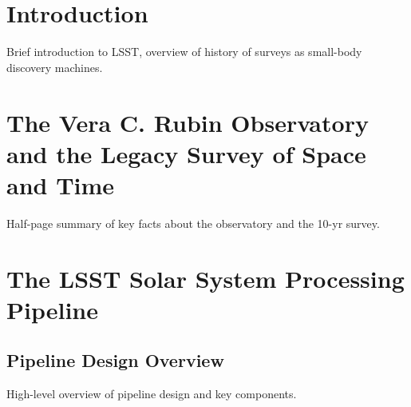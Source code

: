 \section{Introduction}

Brief introduction to LSST, overview of history of surveys as small-body
discovery machines.



\section{The Vera C. Rubin Observatory and the Legacy Survey of Space and Time}

Half-page summary of key facts about the observatory and the 10-yr survey.

\section{The LSST Solar System Processing Pipeline}

\subsection{Pipeline Design Overview}

High-level overview of pipeline design and key components.


